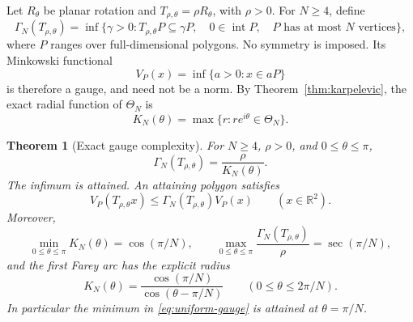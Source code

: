 \documentclass[11pt,a4paper]{article}
\newcommand{\R}{\mathbb R}
\newtheorem{theorem}{Theorem}[section]
\theoremstyle{definition}
\theoremstyle{remark}
\numberwithin{equation}{section}
\begin{document}
Let $R_\theta$ be
planar rotation and $T_{\rho,\theta}=\rho R_\theta$, with $\rho>0$.
For $N\ge4$, define
\[
 \Gamma_N(T_{\rho,\theta})=
 \inf\{\gamma>0:T_{\rho,\theta}P\subseteq\gamma P,
 \quad0\in\operatorname{int}P,
 \quad P\text{ has at most }N\text{ vertices}\},
\]
where $P$ ranges over full-dimensional polygons.  No symmetry is imposed.
Its Minkowski functional
\[
 V_P(x)=\inf\{a>0:x\in aP\}
\]
is therefore a gauge, and need not be a norm.  By
Theorem~\ref{thm:karpelevic}, the exact radial function of $\Theta_N$ is
\[
 K_N(\theta)=\max\{r:re^{i\theta}\in\Theta_N\}.
\]

\begin{theorem}[Exact gauge complexity]\label{thm:gauges}
For $N\ge4$, $\rho>0$, and $0\le\theta\le\pi$,
\begin{equation}\label{eq:gauge-optimum}
 \Gamma_N(T_{\rho,\theta})=\frac{\rho}{K_N(\theta)}.
\end{equation}
The infimum is attained.  An attaining polygon satisfies
\[
 V_P(T_{\rho,\theta}x)\le
 \Gamma_N(T_{\rho,\theta})V_P(x)\qquad(x\in\R^2).
\]
Moreover,
\begin{equation}\label{eq:uniform-gauge}
 \min_{0\le\theta\le\pi}K_N(\theta)=\cos(\pi/N),\qquad
 \max_{0\le\theta\le\pi}
       \frac{\Gamma_N(T_{\rho,\theta})}{\rho}=\sec(\pi/N),
\end{equation}
and the first Farey arc has the explicit radius
\begin{equation}\label{eq:first-arc}
 K_N(\theta)=\frac{\cos(\pi/N)}{\cos(\theta-\pi/N)}
 \qquad(0\le\theta\le2\pi/N).
\end{equation}
In particular the minimum in \eqref{eq:uniform-gauge} is attained at
$\theta=\pi/N$.
\end{theorem}
\end{document}
